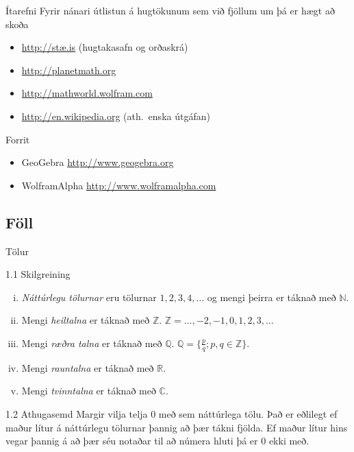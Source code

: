 \documentclass[icelandic,a4paper,12pt]{article}
\newcommand{\C}{{\mathbb  C}}
\newcommand{\Z}{{\mathbb Z}}
\newcommand{\R}{{\mathbb  R}}
\newcommand{\N}{{\mathbb  N}}
\newcommand{\Q}{{\mathbb Q}}
\begin{document}
\begin{frame}{Ítarefni}
 Fyrir nánari útlistun á hugtökunum sem við fjöllum um þá er hægt að skoða
\begin{itemize}
 \item \href{http://stae.is}{http://stæ.is} (hugtakasafn og orðaskrá)
  \item \href{http://planetmath.org}{http://planetmath.org}
  \item \href{http://mathworld.wolfram.com}{http://mathworld.wolfram.com}
  \item \href{http://en.wikipedia.org}{http://en.wikipedia.org} (ath.~enska útgáfan)
\end{itemize}

\pause
\begin{block}{Forrit}
 \begin{itemize}
  \item GeoGebra \href{http://www.geogebra.org}{http://www.geogebra.org}
  \item WolframAlpha \href{http://www.wolframalpha.com}{http://www.wolframalpha.com}
 \end{itemize}

\end{block}

\end{frame}

\subsection*{Föll}	

\begin{frame}{Tölur}
\begin{block}{1.1 Skilgreining}
\begin{enumerate}[(i)]
\item  \emph{Náttúrlegu tölurnar} eru tölurnar
$1, 2, 3, 4, \ldots$ og mengi þeirra er táknað með $\N$.   \pause
\item Mengi \emph{heiltalna} er táknað með $\Z$. $\Z = \ldots,-2,-1,0,1,2,3,\ldots$\pause
\item Mengi \emph{ræðra talna} er táknað með $\Q$. $\Q = \{ \frac pq ; p,q \in \Z \}$.\pause
\item Mengi \emph{rauntalna} er táknað með $\R$.\pause
\item Mengi \emph{tvinntalna} er táknað með $\C$.
\end{enumerate}
\end{block}

\pause

\begin{block}{1.2 Athugasemd}  
Margir vilja telja $0$ með sem náttúrlega tölu.  Það er eðlilegt ef 
maður lítur á náttúrlegu tölurnar þannig að þær tákni fjölda.  Ef maður lítur hins vegar þannig
á að þær séu notaðar til að númera hluti
þá er 0 ekki með.
\end{block}

\end{frame}
\end{document}
